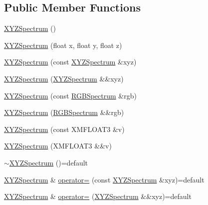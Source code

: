 \subsection*{Public Member Functions}
\begin{DoxyCompactItemize}
\item 
\hyperlink{structmage_1_1_x_y_z_spectrum_a93dbb49e9cb90dd0aed70e9b6d01fcc8}{X\+Y\+Z\+Spectrum} ()
\item 
\hyperlink{structmage_1_1_x_y_z_spectrum_ab768ef493970dd791f8b145eee05f66b}{X\+Y\+Z\+Spectrum} (float x, float y, float z)
\item 
\hyperlink{structmage_1_1_x_y_z_spectrum_ac86feefa604d578f219d17f721508357}{X\+Y\+Z\+Spectrum} (const \hyperlink{structmage_1_1_x_y_z_spectrum}{X\+Y\+Z\+Spectrum} \&xyz)
\item 
\hyperlink{structmage_1_1_x_y_z_spectrum_acd737da8e445f137dae3dd886e4e822b}{X\+Y\+Z\+Spectrum} (\hyperlink{structmage_1_1_x_y_z_spectrum}{X\+Y\+Z\+Spectrum} \&\&xyz)
\item 
\hyperlink{structmage_1_1_x_y_z_spectrum_a91cf5d611fbad0e47b6718a04b9a505d}{X\+Y\+Z\+Spectrum} (const \hyperlink{structmage_1_1_r_g_b_spectrum}{R\+G\+B\+Spectrum} \&rgb)
\item 
\hyperlink{structmage_1_1_x_y_z_spectrum_a0bfea768139190f70cfef880d239b20c}{X\+Y\+Z\+Spectrum} (\hyperlink{structmage_1_1_r_g_b_spectrum}{R\+G\+B\+Spectrum} \&\&rgb)
\item 
\hyperlink{structmage_1_1_x_y_z_spectrum_a0d6ea701678773c93a78ba5c998ed408}{X\+Y\+Z\+Spectrum} (const X\+M\+F\+L\+O\+A\+T3 \&v)
\item 
\hyperlink{structmage_1_1_x_y_z_spectrum_a06edd58bd36637d35e2b3a3e37073ffe}{X\+Y\+Z\+Spectrum} (X\+M\+F\+L\+O\+A\+T3 \&\&v)
\item 
\hyperlink{structmage_1_1_x_y_z_spectrum_af3a318ebdb1eb1e47cd81707850049a7}{$\sim$\+X\+Y\+Z\+Spectrum} ()=default
\item 
\hyperlink{structmage_1_1_x_y_z_spectrum}{X\+Y\+Z\+Spectrum} \& \hyperlink{structmage_1_1_x_y_z_spectrum_afb9ded2a6c69514b9853f753c5f94f98}{operator=} (const \hyperlink{structmage_1_1_x_y_z_spectrum}{X\+Y\+Z\+Spectrum} \&xyz)=default
\item 
\hyperlink{structmage_1_1_x_y_z_spectrum}{X\+Y\+Z\+Spectrum} \& \hyperlink{structmage_1_1_x_y_z_spectrum_a5191cffff5e1560164a34d43aa72441b}{operator=} (\hyperlink{structmage_1_1_x_y_z_spectrum}{X\+Y\+Z\+Spectrum} \&\&xyz)=default
\end{DoxyCompactItemize}


